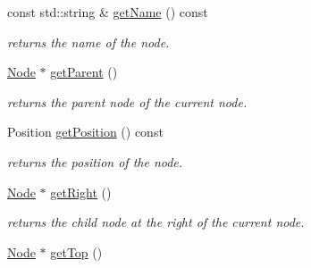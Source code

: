 \begin{DoxyCompactItemize}
\item 
\hypertarget{class_open_chams_1_1_node_aef436e6e20d1dbf2eb78b089ca9d0794}{const std\-::string \& \hyperlink{class_open_chams_1_1_node_aef436e6e20d1dbf2eb78b089ca9d0794}{get\-Name} () const }\label{class_open_chams_1_1_node_aef436e6e20d1dbf2eb78b089ca9d0794}

\begin{DoxyCompactList}\small\item\em returns the name of the node. \end{DoxyCompactList}\item 
\hypertarget{class_open_chams_1_1_node_afa302489ba7f4c55c5de696773c3d57b}{\hyperlink{class_open_chams_1_1_node}{Node} $\ast$ \hyperlink{class_open_chams_1_1_node_afa302489ba7f4c55c5de696773c3d57b}{get\-Parent} ()}\label{class_open_chams_1_1_node_afa302489ba7f4c55c5de696773c3d57b}

\begin{DoxyCompactList}\small\item\em returns the parent node of the current node. \end{DoxyCompactList}\item 
\hypertarget{class_open_chams_1_1_node_a2843ffc4a8a476bc6d96d9a155d3071e}{Position \hyperlink{class_open_chams_1_1_node_a2843ffc4a8a476bc6d96d9a155d3071e}{get\-Position} () const }\label{class_open_chams_1_1_node_a2843ffc4a8a476bc6d96d9a155d3071e}

\begin{DoxyCompactList}\small\item\em returns the position of the node. \end{DoxyCompactList}\item 
\hypertarget{class_open_chams_1_1_node_a9533ddcf078ddfc2a4e9bd9ffafa51cb}{\hyperlink{class_open_chams_1_1_node}{Node} $\ast$ \hyperlink{class_open_chams_1_1_node_a9533ddcf078ddfc2a4e9bd9ffafa51cb}{get\-Right} ()}\label{class_open_chams_1_1_node_a9533ddcf078ddfc2a4e9bd9ffafa51cb}

\begin{DoxyCompactList}\small\item\em returns the child node at the right of the current node. \end{DoxyCompactList}\item 
\hypertarget{class_open_chams_1_1_node_af59967a8c2d5a04ca0a58e2ef29bead1}{\hyperlink{class_open_chams_1_1_node}{Node} $\ast$ \hyperlink{class_open_chams_1_1_node_af59967a8c2d5a04ca0a58e2ef29bead1}{get\-Top} ()}\label{class_open_chams_1_1_node_af59967a8c2d5a04ca0a58e2ef29bead1}


\end{DoxyCompactItemize}
